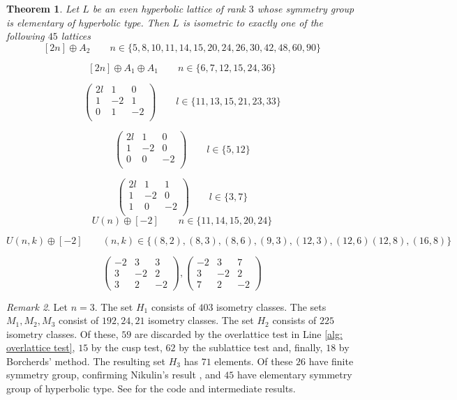 \documentclass[11pt,letterpaper]{amsart}
\newtheorem{theorem}{Theorem}[section]
\theoremstyle{definition}
\theoremstyle{remark}
\newtheorem{remark}[theorem]{Remark}
\begin{document}
\begin{theorem} \label{thm:classification.3}
    Let $L$ be an even hyperbolic lattice of rank $3$ whose symmetry group is elementary of hyperbolic type. Then $L$ is isometric to exactly one of the following $45$ lattices
    \[[2n] \oplus A_2 \qquad n \in \{5, 8, 10, 11, 14, 15, 20, 24, 26, 30, 42, 48, 60, 90\}\]
    
    \[[2n]\oplus A_1 \oplus A_1 \qquad n \in \{6, 7, 12, 15, 24, 36\}\]
    
    \[\begin{pmatrix}
        2l & 1 & 0\\
        1 & -2 & 1\\
        0 & 1 & -2\\
    \end{pmatrix} \qquad l\in \{11, 13, 15, 21, 23, 33\}\]
    
     \[\begin{pmatrix}
        2l & 1 & 0\\
        1 & -2 & 0\\
        0 & 0 & -2\\
    \end{pmatrix} \qquad l\in \{5,12\}\] %
     
     \[\begin{pmatrix}
        2l & 1 & 1\\
        1 & -2 & 0\\
        1 & 0 & -2\\
    \end{pmatrix} \qquad l\in \{3,7\}\] %
    \[U(n) \oplus [-2] \qquad n \in \{11,14,15,20,24\}\]

    \[U(n,k)\oplus [-2] \qquad (n,k) \in \{(8,2),(8,3),(8,6),(9,3),(12,3),(12,6)(12,8),(16,8)\}\]

    \[\begin{pmatrix}
        -2&3&3 \\
        3& -2 &2 \\
        3&  2& -2 
    \end{pmatrix},\begin{pmatrix}
        -2&3&7 \\
        3& -2 &2 \\
        7&  2& -2 
    \end{pmatrix}\]
\end{theorem}
\begin{remark}
Let $n=3$. The set $H_1$ consists of $403$ isometry classes.
The sets $M_1,M_2,M_3$ consist of $192,24,21$ isometry classes.
The set $H_2$ consists of $225$ isometry classes. 
Of these, $59$ are discarded by the overlattice test in Line \ref{alg: overlattice test}, $15$ by the cusp test, $62$ by the sublattice test and, finally, $18$ by Borcherds' method.
The resulting set $H_3$ has $71$ elements. Of these $26$ have finite symmetry group, confirming Nikulin's result \cite{nikulin.finite.aut.3}, and $45$ have elementary symmetry group of hyperbolic type. See \cite{intermediate.data} for the code and intermediate results.
\end{remark}
\end{document}
